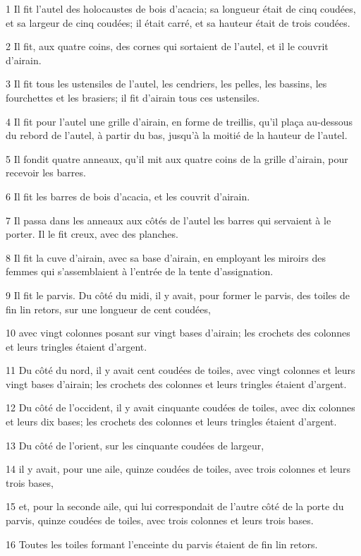 \par 1 Il fit l'autel des holocaustes de bois d'acacia; sa longueur était de cinq coudées, et sa largeur de cinq coudées; il était carré, et sa hauteur était de trois coudées.
\par 2 Il fit, aux quatre coins, des cornes qui sortaient de l'autel, et il le couvrit d'airain.
\par 3 Il fit tous les ustensiles de l'autel, les cendriers, les pelles, les bassins, les fourchettes et les brasiers; il fit d'airain tous ces ustensiles.
\par 4 Il fit pour l'autel une grille d'airain, en forme de treillis, qu'il plaça au-dessous du rebord de l'autel, à partir du bas, jusqu'à la moitié de la hauteur de l'autel.
\par 5 Il fondit quatre anneaux, qu'il mit aux quatre coins de la grille d'airain, pour recevoir les barres.
\par 6 Il fit les barres de bois d'acacia, et les couvrit d'airain.
\par 7 Il passa dans les anneaux aux côtés de l'autel les barres qui servaient à le porter. Il le fit creux, avec des planches.
\par 8 Il fit la cuve d'airain, avec sa base d'airain, en employant les miroirs des femmes qui s'assemblaient à l'entrée de la tente d'assignation.
\par 9 Il fit le parvis. Du côté du midi, il y avait, pour former le parvis, des toiles de fin lin retors, sur une longueur de cent coudées,
\par 10 avec vingt colonnes posant sur vingt bases d'airain; les crochets des colonnes et leurs tringles étaient d'argent.
\par 11 Du côté du nord, il y avait cent coudées de toiles, avec vingt colonnes et leurs vingt bases d'airain; les crochets des colonnes et leurs tringles étaient d'argent.
\par 12 Du côté de l'occident, il y avait cinquante coudées de toiles, avec dix colonnes et leurs dix bases; les crochets des colonnes et leurs tringles étaient d'argent.
\par 13 Du côté de l'orient, sur les cinquante coudées de largeur,
\par 14 il y avait, pour une aile, quinze coudées de toiles, avec trois colonnes et leurs trois bases,
\par 15 et, pour la seconde aile, qui lui correspondait de l'autre côté de la porte du parvis, quinze coudées de toiles, avec trois colonnes et leurs trois bases.
\par 16 Toutes les toiles formant l'enceinte du parvis étaient de fin lin retors.
